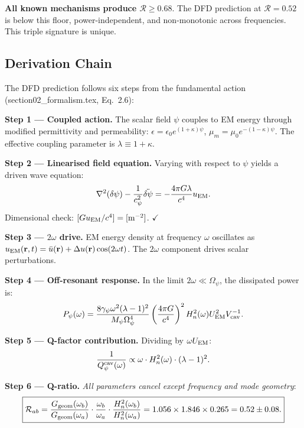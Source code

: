 \documentclass[11pt]{article}
\newcommand{\Rq}{\mathcal{R}}
\newcommand{\Heff}{H_n}
\begin{document}
\textbf{All known mechanisms produce $\Rq \geq 0.68$}. The DFD
prediction at $\Rq = 0.52$ is below this floor, power-independent,
and non-monotonic across frequencies. This triple signature is
unique.

\subsection{Derivation Chain}

The DFD prediction follows six steps from the fundamental action
(section02\_formalism.tex, Eq.~2.6):

\textbf{Step 1 --- Coupled action.} The scalar field $\psi$ couples to
EM energy through modified permittivity and permeability:
$\epsilon = \epsilon_0 e^{(1+\kappa)\psi}$,
$\mu_m = \mu_0 e^{-(1-\kappa)\psi}$. The effective coupling parameter
is $\lambda \equiv 1 + \kappa$.

\textbf{Step 2 --- Linearised field equation.} Varying with respect to
$\psi$ yields a driven wave equation:
\begin{equation}
\nabla^2(\delta\psi) - \frac{1}{c_\psi^2}\ddot{\delta\psi}
= -\frac{4\pi G \lambda}{c^4} u_{\rm EM}.
\end{equation}
Dimensional check: $[G u_{\rm EM}/c^4] = [{\rm m}^{-2}]$.
$\checkmark$

\textbf{Step 3 --- $2\omega$ drive.} EM energy density at frequency
$\omega$ oscillates as $u_{\rm EM}(\mathbf{r},t) = \bar{u}(\mathbf{r})
+ \Delta u(\mathbf{r})\cos(2\omega t)$. The $2\omega$ component drives
scalar perturbations.

\textbf{Step 4 --- Off-resonant response.} In the limit $2\omega \ll
\Omega_\psi$, the dissipated power is:
\begin{equation}
P_\psi(\omega) = \frac{8\gamma_\psi \omega^2 (\lambda-1)^2}
{M_\psi \Omega_\psi^4}
\left(\frac{4\pi G}{c^4}\right)^2
\Heff^2(\omega) U_{\rm EM}^2 V_{\rm cav}^{-1}.
\end{equation}

\textbf{Step 5 --- Q-factor contribution.} Dividing by $\omega U_{\rm EM}$:
\begin{equation}
\frac{1}{Q_\psi^{\rm cav}(\omega)} \propto \omega \cdot
\Heff^2(\omega) \cdot (\lambda-1)^2.
\end{equation}

\textbf{Step 6 --- Q-ratio.} \emph{All parameters cancel except
frequency and mode geometry}:
\begin{equation}
\boxed{
\Rq_{ab} = \frac{G_{\rm geom}(\omega_b)}{G_{\rm geom}(\omega_a)}
\cdot \frac{\omega_b}{\omega_a}
\cdot \frac{\Heff^2(\omega_b)}{\Heff^2(\omega_a)}
= 1.056 \times 1.846 \times 0.265 = 0.52 \pm 0.08.
}
\end{equation}
\end{document}
